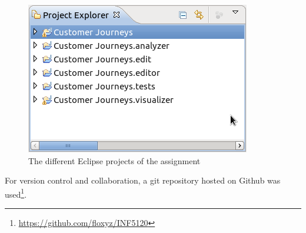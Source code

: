 \documentclass[12pt]{scrartcl}
\begin{document}
\begin{figure}[hbtp]
	\centering
	\includegraphics[scale=0.7]{img/projectexplorer.png}
	\caption{The different Eclipse projects of the assignment}
	\label{figure:projects}
\end{figure}

For version control and collaboration, a git repository hosted on Github was used\footnote{\url{https://github.com/floxyz/INF5120}}.
\end{document}
